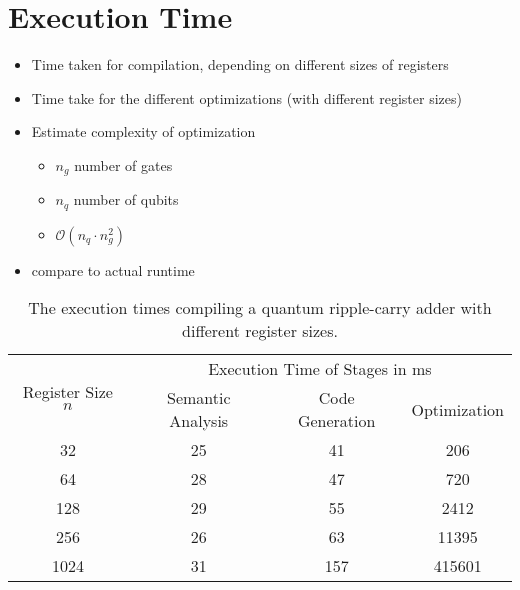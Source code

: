 \section{Execution Time}
\label{sec:eval_executionTime}
\begin{itemize}
    \item Time taken for compilation, depending on different sizes of registers
    \item Time take for the different optimizations (with different register sizes)
    \item Estimate complexity of optimization
    \begin{itemize}
        \item $n_g$ number of gates
        \item $n_q$ number of qubits
        \item $\mathcal{O}(n_q \cdot n_g^2)$
    \end{itemize}
    \item compare to actual runtime
\end{itemize}

\begin{table}[htp]
    \centering     
    \begin{tabular}{c|ccc}
    \multirow{2}{*}{Register Size $n$} & \multicolumn{3}{c}{Execution Time of Stages in ms}                                                  \\ \cline{2-4} 
                                       & \multicolumn{1}{c|}{Semantic Analysis} & \multicolumn{1}{c|}{Code Generation} & Optimization \\ \hline
    32                                 & \multicolumn{1}{c|}{25}                & \multicolumn{1}{c|}{41}              & 206          \\
    64                                 & \multicolumn{1}{c|}{28}                & \multicolumn{1}{c|}{47}              & 720          \\
    128                                & \multicolumn{1}{c|}{29}                & \multicolumn{1}{c|}{55}              & 2412         \\
    256                                & \multicolumn{1}{c|}{26}                & \multicolumn{1}{c|}{63}              & 11395        \\
    1024                               & \multicolumn{1}{c|}{31}                & \multicolumn{1}{c|}{157}             & 415601      
    \end{tabular}
    \caption{The execution times compiling a quantum ripple-carry adder with different register sizes.}
    \label{tab:eval_executionTime}
\end{table}